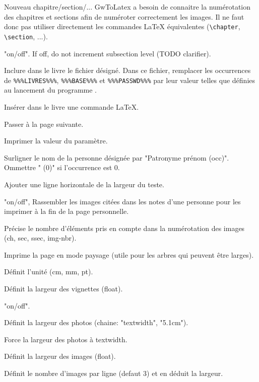 \begin{description}[style=nextline]
\item[Chapter/Section/SubSection/SubSubSection"] Nouveau chapitre/section/...
GwToLatex a besoin de connaitre la numérotation des chapitres et sections afin 
de numéroter correctement les images. Il ne faut donc pas utiliser directement
les commandes LaTeX équivalentes (\verb|\chapter|, \verb|\section|, ...). 
\item["BumpSub"] "on/off". If off, do not increment subsection level (TODO clarifier).

\item["Input"] Inclure dans le livre le fichier désigné. Dans ce fichier,
remplacer les occurrences de \verb|%%%LIVRES%%%|, \verb|%%%BASE%%%| et
\verb|%%%PASSWD%%%| par leur valeur telles que définies au lancement du programme .
\item["LaTeX"] Insérer dans le livre une commande LaTeX.
\item["Newpage"] Passer à la page suivante.
\item["Print"] Imprimer la valeur du paramètre.

\item["HighLight"] Surligner le nom de la personne désignée par "Patronyme prénom (occ)".
Ommettre " (0)" si l'occurrence est 0.
\item["Hrule"] Ajouter une ligne horizontale de la largeur du teste.

\item["CollectImages"] "on/off", Rassembler les images citées dans les notes
d'une personne pour les imprimer à la fin de la page personnelle.
\item["ImageLabel"] Précise le nombre d'éléments pris en compte dans 
la numérotation des images (ch, sec, ssec, img-nbr).
\item["Sideways"] Imprime la page en mode paysage (utile pour les arbres
qui peuvent être larges).\label{sideways}
\item["Unit"] Définit l'unité (cm, mm, pt).
\item["VignWidth"] Définit la largeur des vignettes (float).
\item["Wide"] "on/off".
\item["ImageWidth"] Définit la largeur des photos (chaine: "textwidth", "5.1cm").
\item["WideImage"] Force la largeur des photos à textwidth.
\item["Width"] Définit la largeur des images (float).
\item["NbImgPerLine"] Définit le nombre d'images par ligne (defaut 3) et en
déduit la largeur.


\end{description}
